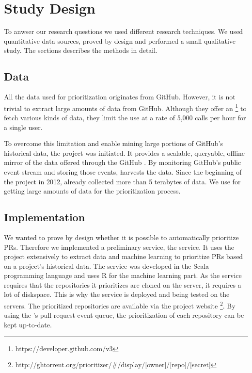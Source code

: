 \section{Study Design}
\label{sec:design}

To anwser our research questions we used different research techniques.
We used quantitative data sources, proved by design and performed a small qualitative study.
The sections describes the methods in detail.

\subsection{Data}
All the data used for prioritization originates from GitHub.
However, it is not trivial to extract large amounts of data from GitHub.
Although they offer an \api\footnote{https://developer.github.com/v3} to fetch various kinds of data, they limit the use at a rate of 5,000 \api calls per hour for a single user.

To overcome this limitation and enable mining large portions of GitHub's historical data, the \ghtorrent project \cite{Gousi13} was initiated.
It provides a scalable, queryable, offline mirror of the data offered through the GitHub \api.
By monitoring GitHub's public event stream and storing those events, \ghtorrent harvests the data.
Since the beginning of the project in 2012, \ghtorrent already collected more than 5 terabytes of data.
We use \ghtorrent for getting large amounts of data for the prioritization process.

\subsection{Implementation}
We wanted to prove by design whether it is possible to automatically prioritize PRs.
Therefore we implemented a preliminary service, the \prioritizer service.
It uses the \ghtorrent project extensively to extract data and machine learning to prioritize PRs based on a project's historical data.
The service was developed in the Scala programming language and uses R for the machine learning part.
As the service requires that the repositories it prioritizes are cloned on the server, it requires a lot of diskspace.
This is why the service is deployed and being tested on the \ghtorrent servers.
The prioritized repositories are available via the \ghtorrent project website \footnote{http://ghtorrent.org/prioritizer/\#/display/[owner]/[repo]/[secret]}.
By using the \ghtorrent's pull request event queue, the prioritization of each repository can be kept up-to-date.

